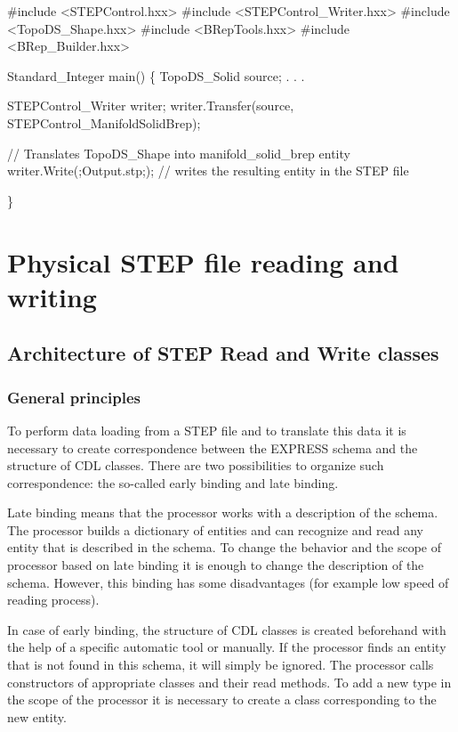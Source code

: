 \begin{DoxyCode}
\textcolor{preprocessor}{#include <STEPControl.hxx>} 
\textcolor{preprocessor}{#include <STEPControl\_Writer.hxx>} 
\textcolor{preprocessor}{#include <TopoDS\_Shape.hxx>} 
\textcolor{preprocessor}{#include <BRepTools.hxx>} 
\textcolor{preprocessor}{#include <BRep\_Builder.hxx>} 

Standard\_Integer main() 
\{ 
TopoDS\_Solid source; 
. . . 

STEPControl\_Writer writer; 
writer.Transfer(source, STEPControl\_ManifoldSolidBrep); 

\textcolor{comment}{// Translates TopoDS\_Shape into manifold\_solid\_brep entity }
writer.Write(;Output.stp;); 
\textcolor{comment}{// writes the resulting entity in the STEP file }

\} 
\end{DoxyCode}
\hypertarget{occt_user_guides__step_occt_step_4}{}\section{Physical S\+T\+E\+P file reading and writing}\label{occt_user_guides__step_occt_step_4}
\hypertarget{occt_user_guides__step_occt_step_4_1}{}\subsection{Architecture of S\+T\+E\+P Read and Write classes}\label{occt_user_guides__step_occt_step_4_1}
\hypertarget{occt_user_guides__step_occt_step_4_1_1}{}\subsubsection{General principles}\label{occt_user_guides__step_occt_step_4_1_1}
To perform data loading from a S\+T\+EP file and to translate this data it is necessary to create correspondence between the E\+X\+P\+R\+E\+SS schema and the structure of C\+DL classes. There are two possibilities to organize such correspondence\+: the so-\/called early binding and late binding.
\begin{DoxyItemize}
\item Late binding means that the processor works with a description of the schema. The processor builds a dictionary of entities and can recognize and read any entity that is described in the schema. To change the behavior and the scope of processor based on late binding it is enough to change the description of the schema. However, this binding has some disadvantages (for example low speed of reading process).
\item In case of early binding, the structure of C\+DL classes is created beforehand with the help of a specific automatic tool or manually. If the processor finds an entity that is not found in this schema, it will simply be ignored. The processor calls constructors of appropriate classes and their read methods. To add a new type in the scope of the processor it is necessary to create a class corresponding to the new entity.
\end{DoxyItemize}

